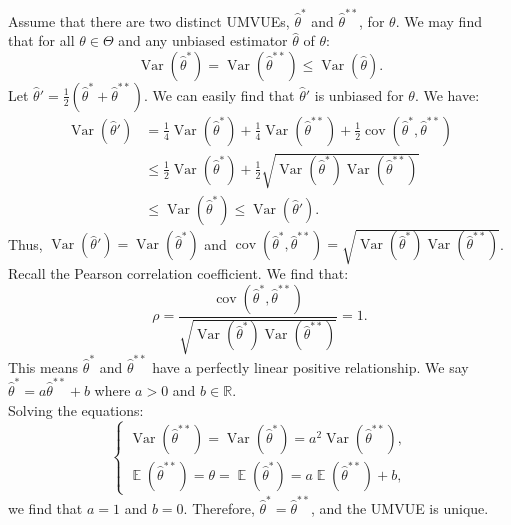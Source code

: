 \documentclass{huhtakm-template-book-v2}
\DeclareMathOperator{\E}{\mathbb{E}}
\DeclareMathOperator{\Var}{Var}
\DeclareMathOperator{\cov}{cov}
\begin{document}
    \begin{proofing}
        Assume that there are two distinct UMVUEs, $\hat{\theta}^{*}$ and $\hat{\theta}^{**}$, for $\theta$. We may find that for all $\theta \in \Theta$ and any unbiased estimator $\hat{\theta}$ of $\theta$:
        \begin{equation*}
            \Var(\hat{\theta}^{*}) = \Var(\hat{\theta}^{**}) \leq \Var(\hat{\theta}).
        \end{equation*}
        Let $\hat{\theta}' = \frac{1}{2}(\hat{\theta}^{*} + \hat{\theta}^{**})$. We can easily find that $\hat{\theta}'$ is unbiased for $\theta$. We have:
        \begin{align*}
            \Var(\hat{\theta}') &= \frac{1}{4}\Var(\hat{\theta}^{*}) + \frac{1}{4}\Var(\hat{\theta}^{**}) + \frac{1}{2}\cov(\hat{\theta}^{*}, \hat{\theta}^{**})\\
            &\leq \frac{1}{2}\Var(\hat{\theta}^{*}) + \frac{1}{2}\sqrt{\Var(\hat{\theta}^{*})\Var(\hat{\theta}^{**})}\\
            &\leq \Var(\hat{\theta}^{*}) \leq \Var(\hat{\theta}').
        \end{align*}
        Thus, $\Var(\hat{\theta}') = \Var(\hat{\theta}^{*})$ and $\cov(\hat{\theta}^{*}, \hat{\theta}^{**}) = \sqrt{\Var(\hat{\theta}^{*})\Var(\hat{\theta}^{**})}$.\\
        Recall the Pearson correlation coefficient. We find that:
        \begin{equation*}
            \rho = \frac{\cov(\hat{\theta}^{*}, \hat{\theta}^{**})}{\sqrt{\Var(\hat{\theta}^{*})\Var(\hat{\theta}^{**})}} = 1.
        \end{equation*}
        This means $\hat{\theta}^{*}$ and $\hat{\theta}^{**}$ have a perfectly linear positive relationship. We say $\hat{\theta}^{*} = a\hat{\theta}^{**} + b$ where $a > 0$ and $b \in \mathbb{R}$.\\
        Solving the equations:
        \begin{equation*}
            \begin{cases}
                \Var(\hat{\theta}^{**}) = \Var(\hat{\theta}^{*}) = a^{2}\Var(\hat{\theta}^{**}),\\
                \E(\hat{\theta}^{**}) = \theta = \E(\hat{\theta}^{*}) = a\E(\hat{\theta}^{**}) + b,
            \end{cases}
        \end{equation*}
        we find that $a = 1$ and $b = 0$. Therefore, $\hat{\theta}^{*} = \hat{\theta}^{**}$, and the UMVUE is unique.
    \end{proofing}
    
\end{document}
